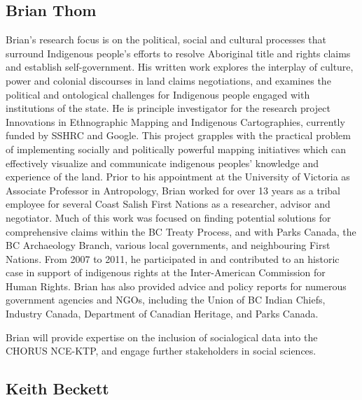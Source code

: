 \subsection*{Brian Thom}

Brian's research focus is on the political, social and cultural
processes that surround Indigenous people's efforts to resolve
Aboriginal title and rights claims and establish self-government.  His
written work explores the interplay of culture, power and colonial
discourses in land claims negotiations, and examines the political and
ontological challenges for Indigenous people engaged with institutions
of the state.  He is principle investigator for the research project
Innovations in Ethnographic Mapping and Indigenous Cartographies,
currently funded by SSHRC and Google. This project grapples with the
practical problem of implementing socially and politically powerful
mapping initiatives which can effectively visualize and communicate
indigenous peoples’ knowledge and experience of the land.
Prior to his appointment at the University of Victoria as Associate
Professor in Antropology, Brian worked for over 13 years as a tribal
employee for several Coast Salish First Nations as a researcher, advisor
and negotiator. Much of this work was focused on finding potential solutions
for comprehensive claims within the BC Treaty Process, and with Parks Canada,
the BC Archaeology Branch, various local governments, and neighbouring First
Nations.  From 2007 to 2011, he participated in and contributed to an
historic case in support of indigenous rights at the Inter-American
Commission for Human Rights.  Brian has also provided advice and policy
reports for numerous government agencies and NGOs, including the Union of
BC Indian Chiefs, Industry Canada, Department of Canadian Heritage, and
Parks Canada. 

Brian will provide expertise on the inclusion of socialogical data
into the CHORUS NCE-KTP, and engage further stakeholders in social sciences.


\subsection*{Keith Beckett}

